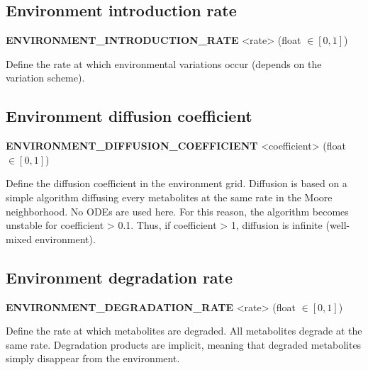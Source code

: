 
\subsection{Environment introduction rate}
\begin{center}
{\bf ENVIRONMENT\_INTRODUCTION\_RATE} <rate> (float $\in [0, 1]$)
\end{center}
Define the rate at which environmental variations occur (depends on the variation scheme).


\subsection{Environment diffusion coefficient}
\begin{center}
{\bf ENVIRONMENT\_DIFFUSION\_COEFFICIENT} <coefficient> (float $\in [0, 1]$)
\end{center}
Define the diffusion coefficient in the environment grid. Diffusion is based on a simple algorithm diffusing every metabolites at the same rate in the Moore neighborhood. No ODEs are used here. For this reason, the algorithm becomes unstable for coefficient > 0.1. Thus, if coefficient > 1, diffusion is infinite (well-mixed environment).


\subsection{Environment degradation rate}
\begin{center}
{\bf ENVIRONMENT\_DEGRADATION\_RATE} <rate> (float $\in [0, 1]$)
\end{center}
Define the rate at which metabolites are degraded. All metabolites degrade at the same rate. Degradation products are implicit, meaning that degraded metabolites simply disappear from the environment.














